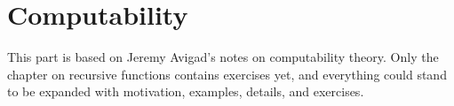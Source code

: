 \documentclass[../../include/open-logic-part]{subfiles}
\begin{document}
\part{Computability}

\begin{editorial}
  This part is based on Jeremy Avigad's notes on computability
  theory. Only the chapter on recursive functions contains exercises
  yet, and everything could stand to be expanded with motivation,
  examples, details, and exercises.
\end{editorial}




\OLEndPartHook
\end{document}
